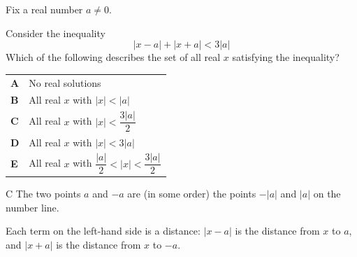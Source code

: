 \documentclass[11pt,a4paper]{article}
\begin{document}
\begin{enumerate}[label=\textbf{\arabic*.},leftmargin=*,itemsep=0pt,start=2]
\questionitem[Inequalities]
Fix a real number $a\ne 0$.

Consider the inequality \[ |x-a|+|x+a|<3|a| \] Which of the following describes the set of all real $x$ satisfying the inequality?

\par\vspace*{12pt}
\begin{tabularx}{\linewidth}{@{}>{\bfseries}l Y@{}}
A &
No real solutions
\\[0.8em]
B &
All real $x$ with $|x|<|a|$
\\[0.8em]
C &
All real $x$ with $|x|<\dfrac{3|a|}{2}$
\\[0.8em]
D &
All real $x$ with $|x|<3|a|$
\\[0.8em]
E &
All real $x$ with $\dfrac{|a|}{2}<|x|<\dfrac{3|a|}{2}$
\\
\end{tabularx}

\begin{djsSolution}{C}
The two points $a$ and $-a$ are (in some order) the points $-|a|$ and $|a|$ on the number line.

Each term on the left-hand side is a distance: $|x-a|$ is the distance from $x$ to $a$, and $|x+a|$ is the distance from $x$ to $-a$.

\begin{djsSolutionFigure}
\end{djsSolutionFigure}
\end{djsSolution}
\end{enumerate}
\end{document}
